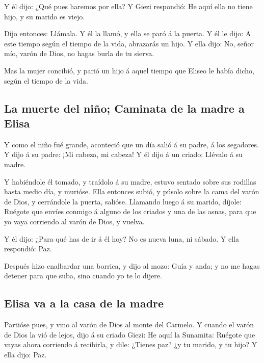  Y él dijo: ¿Qué pues haremos por ella? Y Giezi respondió:
He aquí ella no tiene hijo, y su marido es viejo.

 Dijo entonces: Llámala. Y él la llamó, y ella se paró á la
puerta.  Y él le dijo: A este tiempo según el tiempo de la
vida, abrazarás un hijo. Y ella dijo: No, señor mío, varón de Dios, no
hagas burla de tu sierva.

 Mas la mujer concibió, y parió un hijo á aquel tiempo que
Eliseo le había dicho, según el tiempo de la vida.

\hypertarget{la-muerte-del-niuxf1o-caminata-de-la-madre-a-elisa}{%
\subsection{La muerte del niño; Caminata de la madre a
Elisa}\label{la-muerte-del-niuxf1o-caminata-de-la-madre-a-elisa}}

 Y como el niño fué grande, aconteció que un día salió á su
padre, á los segadores.  Y dijo á su padre: ¡Mi cabeza, mi
cabeza! Y él dijo á un criado: Llévalo á su madre.

 Y habiéndole él tomado, y traídolo á su madre, estuvo
sentado sobre sus rodillas hasta medio día, y murióse. 
Ella entonces subió, y púsolo sobre la cama del varón de Dios, y
cerrándole la puerta, salióse.  Llamando luego á su marido,
díjole: Ruégote que envíes conmigo á alguno de los criados y una de las
asnas, para que yo vaya corriendo al varón de Dios, y vuelva.

 Y él dijo: ¿Para qué has de ir á él hoy? No es nueva luna,
ni sábado. Y ella respondió: Paz.

 Después hizo enalbardar una borrica, y dijo al mozo: Guía
y anda; y no me hagas detener para que suba, sino cuando yo te lo
dijere.

\hypertarget{elisa-va-a-la-casa-de-la-madre}{%
\subsection{Elisa va a la casa de la
madre}\label{elisa-va-a-la-casa-de-la-madre}}

 Partióse pues, y vino al varón de Dios al monte del
Carmelo. Y cuando el varón de Dios la vió de lejos, dijo á su criado
Giezi: He aquí la Sunamita:  Ruégote que vayas ahora
corriendo á recibirla, y dile: ¿Tienes paz? ¿y tu marido, y tu hijo? Y
ella dijo: Paz.

